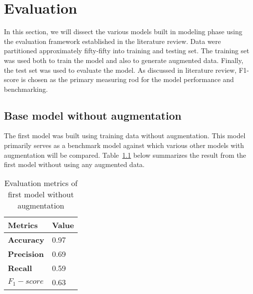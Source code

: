 \chapter{Evaluation}
\label{chapter:evaluation}
In this section, we will dissect the various models built in modeling phase using the evaluation framework established in the literature review. Data were partitioned approximately fifty-fifty into training and testing set. The training set was used both to train the model and also to generate augmented data. Finally, the test set was used to evaluate the model. As discussed in literature review, F1-score is chosen as the primary measuring rod for the model performance and benchmarking.


\section{Base model without augmentation} 

The first model was built using training data without augmentation. This model primarily serves as a benchmark model against which various other models with augmentation will be compared. Table~\ref{table:model1_result} below summarizes the result from the first model without using any augmented data. 


\begin{table}[ht]
	\centering
	\caption{Evaluation metrics of first model without augmentation}
	\label{table:model1_result}
	\begin{tabular}{|p{2cm}|p{2cm}|} 
		\hline %
		\textbf{Metrics} & \textbf{Value}\\ 
		\hline
		\textbf{Accuracy} & 0.97  \\ 
		\textbf{Precision} & 0.69  \\ 
 
		\textbf{Recall} & 0.59 \\ 
		\textbf{\textbf{$F_1-score$}} & 0.63 \\ 
		
		\hline		
	\end{tabular} %
	
\end{table} %

